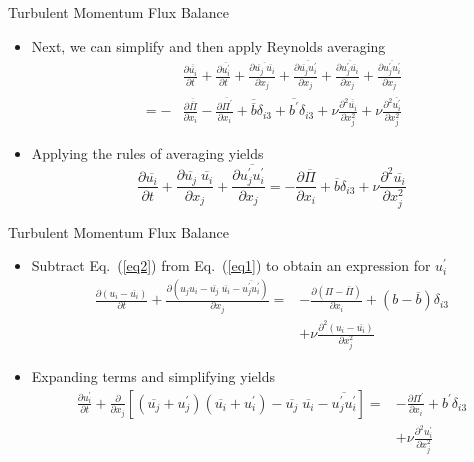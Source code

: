 \begin{frame}{Turbulent Momentum Flux Balance}
\begin{itemize}
  	\item Next, we can simplify and then apply Reynolds averaging
  	\begin{align*}
  	&\frac{\partial \overline{\overline{u_i}}}{\partial t} + \frac{\partial \overline{u_i^\prime}}{\partial t} + \frac{\partial \overline{\overline{u_j}\;\overline{u_i}}}{\partial x_j} + \frac{\partial \overline{\overline{u_j}u_i^\prime}}{\partial x_j} + \frac{\partial \overline{u_j^\prime \overline{u_i}}}{\partial x_j} + \frac{\partial \overline{u_j^\prime u_i^\prime}}{\partial x_j}\\
  	=-&\frac{\partial \overline{\overline{\Pi}}}{\partial x_i} -\frac{\partial \overline{\Pi^\prime}}{\partial x_i} + \overline{\overline{b}}\delta_{i3} + \overline{b^\prime}\delta_{i3} + \nu\frac{\partial^2 \overline{\overline{u_i}}}{\partial x_j^2} + \nu\frac{\partial^2 \overline{u_i^\prime}}{\partial x_j^2}
  	\end{align*}
  	\item Applying the rules of averaging yields
  	\begin{equation}
  	\label{eq2}
  		\frac{\partial \overline{u_i}}{\partial t} + \frac{\partial \overline{u_j}\;\overline{u_i}}{\partial x_j} + \frac{\partial \overline{u_j^\prime  u_i^\prime}}{\partial x_j} = -\frac{\partial \overline{\Pi}}{\partial x_i} + \overline{b}\delta_{i3} +  \nu\frac{\partial^2 \overline{u_i}}{\partial x_j^2}
  	\end{equation}
  \end{itemize}
\end{frame}
\begin{frame}{Turbulent Momentum Flux Balance}
\begin{itemize}
  	\item Subtract Eq.~(\ref{eq2}) from Eq.~(\ref{eq1}) to obtain an expression for $u_i^\prime$
  	\begin{align*}
  	\frac{\partial (u_i - \overline{u_i})}{\partial t} + \frac{\partial (u_j u_i - \overline{u_j}\; \overline{u_i} - \overline{u_j^\prime  u_i^\prime})}{\partial x_j} = &-\frac{\partial (\Pi - \overline{\Pi})}{\partial x_i} + (b-\overline{b})\delta_{i3} \\&+ \nu \frac{\partial^2 (u_i - \overline{u_i})}{\partial x_j^2}
  	\end{align*}
  	\item Expanding terms and simplifying yields
  	\begin{align*}
  	\frac{\partial u_i^\prime}{\partial t} + \frac{\partial}{\partial x_j}\left[ (\overline{u_j} + u_j^\prime)(\overline{u_i} + u_i^\prime) - \overline{u_j}\; \overline{u_i} - \overline{u_j^\prime u_i^\prime}\right] = &-\frac{\partial \Pi^\prime}{\partial x_i} + b^\prime\delta_{i3} \\&+ \nu \frac{\partial^2 u_i^\prime}{\partial x_j^2}
  	\end{align*}
  \end{itemize}
\end{frame}
